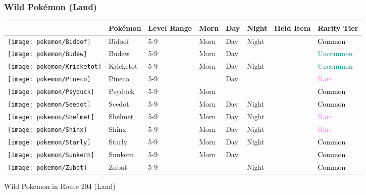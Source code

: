 \subsubsection{Wild Pokémon (Land)}%
\label{ssubsec:WildPokmon(Land)}%
\begin{longtable}{||l l l l l l l l||}%
\hline%
&Pokémon&Level Range&Morn&Day&Night&Held Item&Rarity Tier\\%
\hline%
\endhead%
\hline%
\texttt{[image: pokemon/Bidoof]}&Bidoof&5{-}9&Morn&Day&Night&&\textcolor{black}{%
Common%
}\\%
\hline%
\texttt{[image: pokemon/Budew]}&Budew&5{-}9&Morn&Day&&&\textcolor{teal}{%
Uncommon%
}\\%
\hline%
\texttt{[image: pokemon/Kricketot]}&Kricketot&5{-}9&Morn&Day&Night&&\textcolor{teal}{%
Uncommon%
}\\%
\hline%
\texttt{[image: pokemon/Pineco]}&Pineco&5{-}9&&Day&&&\textcolor{violet}{%
Rare%
}\\%
\hline%
\texttt{[image: pokemon/Psyduck]}&Psyduck&5{-}9&Morn&&&&\textcolor{black}{%
Common%
}\\%
\hline%
\texttt{[image: pokemon/Seedot]}&Seedot&5{-}9&Morn&Day&Night&&\textcolor{black}{%
Common%
}\\%
\hline%
\texttt{[image: pokemon/Shelmet]}&Shelmet&5{-}9&Morn&Day&Night&&\textcolor{violet}{%
Rare%
}\\%
\hline%
\texttt{[image: pokemon/Shinx]}&Shinx&5{-}9&Morn&Day&Night&&\textcolor{violet}{%
Rare%
}\\%
\hline%
\texttt{[image: pokemon/Starly]}&Starly&5{-}9&Morn&Day&Night&&\textcolor{black}{%
Common%
}\\%
\hline%
\texttt{[image: pokemon/Sunkern]}&Sunkern&5{-}9&Morn&Day&&&\textcolor{black}{%
Common%
}\\%
\hline%
\texttt{[image: pokemon/Zubat]}&Zubat&5{-}9&&&Night&&\textcolor{black}{%
Common%
}\\%
\hline%
\end{longtable}%
\caption{Wild Pokemon in Route 204 (Land)}